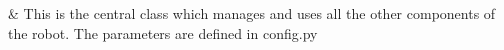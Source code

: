 \documentclass[letterpaper,10pt,english]{sphinxmanual}
\begin{document}
\begin{savenotes}\sphinxattablestart
\sphinxthistablewithglobalstyle
\sphinxthistablewithnovlinesstyle
\centering
\begin{tabulary}{\linewidth}[t]{}
\sphinxtoprule
\sphinxtableatstartofbodyhook
\sphinxAtStartPar
{\hyperref[\detokenize{autoapi/robotlibrary/robot/index:robotlibrary.robot.Robot}]{}}
&
\sphinxAtStartPar
This is the central class which manages and uses all the other components of the robot. The parameters are defined in config.py
\\
\sphinxbottomrule
\end{tabulary}
\sphinxtableafterendhook\par
\sphinxattableend\end{savenotes}
\end{document}
